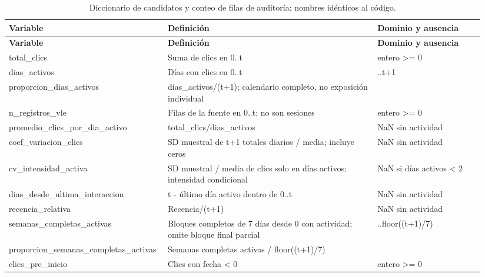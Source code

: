 \begin{longtable}{>{\raggedright\arraybackslash}p{0.29\linewidth}>{\raggedright\arraybackslash}p{0.43\linewidth}>{\raggedright\arraybackslash}p{0.22\linewidth}}
\caption[Diccionario de candidatos y conteo de filas de auditoría.]{Diccionario de candidatos y conteo de filas de auditoría; nombres idénticos al código.}\label{corr:diccionario}\\
\toprule
\textbf{Variable} & \textbf{Definición} & \textbf{Dominio y ausencia} \\
\midrule\endfirsthead
\toprule
\textbf{Variable} & \textbf{Definición} & \textbf{Dominio y ausencia} \\
\midrule\endhead
\bottomrule\endfoot
total\_\allowbreak{}clics & Suma de clics en 0..t & entero >= 0 \\
dias\_\allowbreak{}activos & Días con clics en 0..t & 0..t+1 \\
proporcion\_\allowbreak{}dias\_\allowbreak{}activos & dias\_\allowbreak{}activos/(t+1); calendario completo, no exposición individual & [0,1] \\
n\_\allowbreak{}registros\_\allowbreak{}vle & Filas de la fuente en 0..t; no son sesiones & entero >= 0 \\
promedio\_\allowbreak{}clics\_\allowbreak{}por\_\allowbreak{}dia\_\allowbreak{}activo & total\_\allowbreak{}clics/dias\_\allowbreak{}activos & NaN sin actividad \\
coef\_\allowbreak{}variacion\_\allowbreak{}clics & SD muestral de t+1 totales diarios / media; incluye ceros & NaN sin actividad \\
cv\_\allowbreak{}intensidad\_\allowbreak{}activa & SD muestral / media de clics solo en días activos; intensidad condicional & NaN si días activos < 2 \\
dias\_\allowbreak{}desde\_\allowbreak{}ultima\_\allowbreak{}interaccion & t - último día activo dentro de 0..t & NaN sin actividad \\
recencia\_\allowbreak{}relativa & Recencia/(t+1) & NaN sin actividad \\
semanas\_\allowbreak{}completas\_\allowbreak{}activas & Bloques completos de 7 días desde 0 con actividad; omite bloque final parcial & 0..floor((t+1)/7) \\
proporcion\_\allowbreak{}semanas\_\allowbreak{}completas\_\allowbreak{}activas & Semanas completas activas / floor((t+1)/7) & [0,1] \\
clics\_\allowbreak{}pre\_\allowbreak{}inicio & Clics con fecha < 0 & entero >= 0 \\

\end{longtable}
